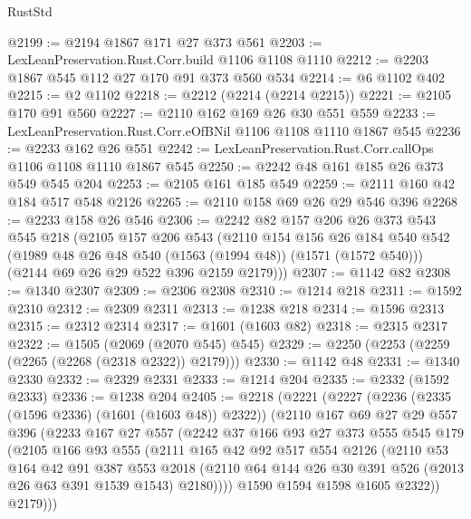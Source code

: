 \begin{lexlean}{RustStd}
\begin{coremodule}
@2199 := @2194 @1867 @171 @27 @373 @561
@2203 := LexLeanPreservation.Rust.Corr.build @1106 @1108 @1110
@2212 := @2203 @1867 @545 @112 @27 @170 @91 @373 @560 @534
@2214 := @6 @1102 @402
@2215 := @2 @1102
@2218 := @2212 (@2214 (@2214 @2215))
@2221 := @2105 @170 @91 @560
@2227 := @2110 @162 @169 @26 @30 @551 @559
@2233 := LexLeanPreservation.Rust.Corr.eOfBNil @1106 @1108 @1110 @1867 @545
@2236 := @2233 @162 @26 @551
@2242 := LexLeanPreservation.Rust.Corr.callOps @1106 @1108 @1110 @1867 @545
@2250 := @2242 @48 @161 @185 @26 @373 @549 @545 @204
@2253 := @2105 @161 @185 @549
@2259 := @2111 @160 @42 @184 @517 @548 @2126
@2265 := @2110 @158 @69 @26 @29 @546 @396
@2268 := @2233 @158 @26 @546
@2306 := @2242
    @82
    @157
    @206
    @26
    @373
    @543
    @545
    @218
    (@2105
      @157
      @206
      @543
      (@2110
        @154
        @156
        @26
        @184
        @540
        @542
        (@1989 @48 @26 @48 @540 (@1563 (@1994 @48)) (@1571 (@1572 @540)))
        (@2144 @69 @26 @29 @522 @396 @2159 @2179)))
@2307 := @1142 @82
@2308 := @1340 @2307
@2309 := @2306 @2308
@2310 := @1214 @218
@2311 := @1592 @2310
@2312 := @2309 @2311
@2313 := @1238 @218
@2314 := @1596 @2313
@2315 := @2312 @2314
@2317 := @1601 (@1603 @82)
@2318 := @2315 @2317
@2322 := @1505 (@2069 (@2070 @545) @545)
@2329 := @2250 (@2253 (@2259 (@2265 (@2268 (@2318 @2322)) @2179)))
@2330 := @1142 @48
@2331 := @1340 @2330
@2332 := @2329 @2331
@2333 := @1214 @204
@2335 := @2332 (@1592 @2333)
@2336 := @1238 @204
@2405 := @2218
    (@2221
      (@2227
        (@2236 (@2335 (@1596 @2336) (@1601 (@1603 @48)) @2322))
        (@2110
          @167
          @69
          @27
          @29
          @557
          @396
          (@2233
            @167
            @27
            @557
            (@2242
              @37
              @166
              @93
              @27
              @373
              @555
              @545
              @179
              (@2105
                @166
                @93
                @555
                (@2111
                  @165
                  @42
                  @92
                  @517
                  @554
                  @2126
                  (@2110
                    @53
                    @164
                    @42
                    @91
                    @387
                    @553
                    @2018
                    (@2110 @64 @144 @26 @30 @391 @526 (@2013 @26 @63 @391 @1539 @1543) @2180))))
              @1590
              @1594
              @1598
              @1605
              @2322))
          @2179)))

\end{coremodule}
\end{lexlean}
